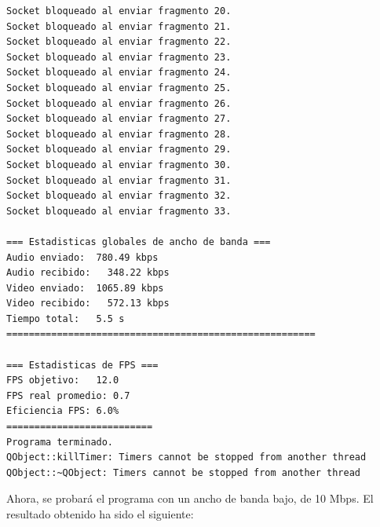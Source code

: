\begin{adjustbox}{max width=\textwidth}
\begin{lstlisting}[language=bash,basicstyle=\ttfamily\scriptsize]
Socket bloqueado al enviar fragmento 20.
Socket bloqueado al enviar fragmento 21.
Socket bloqueado al enviar fragmento 22.
Socket bloqueado al enviar fragmento 23.
Socket bloqueado al enviar fragmento 24.
Socket bloqueado al enviar fragmento 25.
Socket bloqueado al enviar fragmento 26.
Socket bloqueado al enviar fragmento 27.
Socket bloqueado al enviar fragmento 28.
Socket bloqueado al enviar fragmento 29.
Socket bloqueado al enviar fragmento 30.
Socket bloqueado al enviar fragmento 31.
Socket bloqueado al enviar fragmento 32.
Socket bloqueado al enviar fragmento 33.

=== Estadisticas globales de ancho de banda ===
Audio enviado:	780.49 kbps
Audio recibido:   348.22 kbps
Video enviado:	1065.89 kbps
Video recibido:   572.13 kbps
Tiempo total: 	5.5 s
=======================================================

=== Estadisticas de FPS ===
FPS objetivo: 	12.0
FPS real promedio: 0.7
Eficiencia FPS:	6.0%
==========================
Programa terminado.
QObject::killTimer: Timers cannot be stopped from another thread
QObject::~QObject: Timers cannot be stopped from another thread
\end{lstlisting}
\end{adjustbox}
\vspace{\baselineskip}

\newpage

Ahora, se probará el programa con un ancho de banda bajo, de 10 Mbps. El resultado obtenido ha sido el siguiente:
\vspace{\baselineskip}

